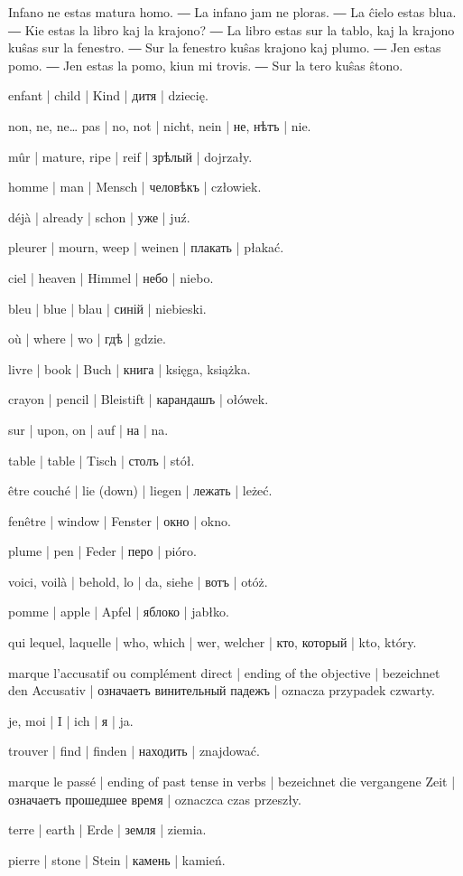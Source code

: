 
Infano ne estas matura homo. ― La infano jam ne ploras. ― La ĉielo estas blua. ― Kie estas la libro kaj la krajono? ― La libro estas sur la tablo, kaj la krajono kuŝas sur la fenestro. ― Sur la fenestro kuŝas krajono kaj plumo. ― Jen estas pomo. ― Jen estas la pomo, kiun mi trovis. ― Sur la tero kuŝas ŝtono.

\begin{ekzvocab}{1em}
 enfant | child | Kind | дитя | dziecię.

 non, ne, ne\ldots{} pas | no, not | nicht, nein | не, нѣтъ | nie.

 mûr | mature, ripe | reif | зрѣлый | dojrzały.

 homme | man | Mensch | человѣкъ | człowiek.

 déjà | already | schon | уже | juź.

 pleurer | mourn, weep | weinen | плакать | płakać.

 ciel | heaven | Himmel | небо | niebo.

 bleu | blue | blau | синій | niebieski.

 où | where | wo | гдѣ | gdzie.

 livre | book | Buch | книга | księga, książka.

 crayon | pencil | Bleistift | карандашъ | ołówek.

 sur | upon, on | auf | на | na.

 table | table | Tisch | столъ | stół.

 être couché | lie (down) | liegen | лежать | leżeć.

 fenêtre | window | Fenster | окно | okno.

 plume | pen | Feder | перо | pióro.

 voici, voilà | behold, lo | da, siehe | вотъ | otóż.

 pomme | apple | Apfel | яблоко | jabłko.

 qui lequel, laquelle | who, which | wer, welcher | кто, который | kto, który.

 marque l’accusatif ou complément direct | ending of the objective | bezeichnet den Accusativ | означаетъ винительный падежъ | oznacza przypadek czwarty.

 je, moi | I | ich | я | ja.

 trouver | find | finden | находить | znajdować.

 marque le passé | ending of past tense in verbs | bezeichnet die vergangene Zeit | означаетъ прошедшее время | oznaczca czas przeszły.

 terre | earth | Erde | земля | ziemia.

 pierre | stone | Stein | камень | kamień.

\end{ekzvocab}



